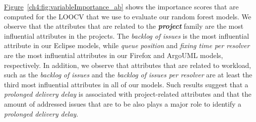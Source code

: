 \DIFaddend \hyperref[ch4:fig:variableImportance_ab]{Figure}~\ref{ch4:fig:variableImportance_ab}
shows the importance scores that are computed for the LOOCV that we use to
evaluate our random forest models. We observe that the attributes that are
related to the \textit{\textbf{project}} family are the most influential
attributes in the projects. The \textit{backlog of issues} is the most
influential attribute in our Eclipse models, while \textit{queue position} and
\textit{fixing time per resolver} are the most influential attributes in our
Firefox and ArgoUML models, respectively. In addition, we observe that
attributes that are related to workload, such as the \textit{backlog of issues}
and the \textit{backlog of issues per resolver} are at least the third most
influential attributes in all of our models. Such results suggest that a
\textit{prolonged delivery delay} is associated with project-related attributes and
that the amount of addressed issues that are to be \DIFdelbegin {}\DIFdelend \DIFaddbegin {}\DIFaddend also plays a major
role to identify a \textit{prolonged delivery delay}. \\


